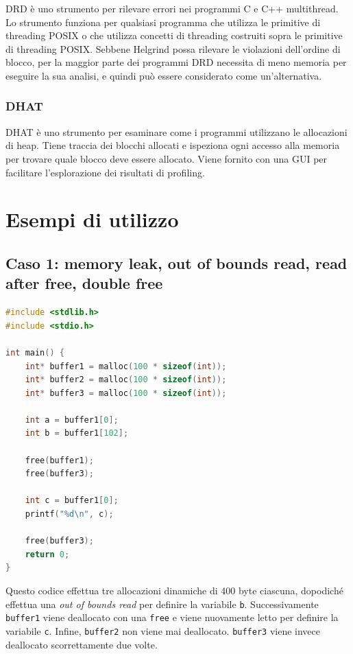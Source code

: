 \documentclass{article}
\begin{document}
DRD è uno strumento per rilevare errori nei programmi C e C++ multithread. Lo
strumento funziona per qualsiasi programma che utilizza le primitive di
threading POSIX o che utilizza concetti di threading costruiti sopra le
primitive di threading POSIX. Sebbene Helgrind possa rilevare le violazioni
dell'ordine di blocco, per la maggior parte dei programmi DRD necessita di meno
memoria per eseguire la sua analisi, e quindi può essere considerato come
un'alternativa.

\subsubsection{DHAT}

DHAT è uno strumento per esaminare come i programmi utilizzano le allocazioni di
heap. Tiene traccia dei blocchi allocati e ispeziona ogni accesso alla memoria
per trovare quale blocco deve essere allocato. Viene fornito con una GUI per
facilitare l'esplorazione dei risultati di profiling.


\newpage
\section{Esempi di utilizzo}

\subsection{Caso 1: memory leak, out of bounds read, read after free, double free}
\label{sec:caso1}

\begin{lstlisting}[language=c]
#include <stdlib.h>
#include <stdio.h>

int main() {
    int* buffer1 = malloc(100 * sizeof(int));
    int* buffer2 = malloc(100 * sizeof(int));
    int* buffer3 = malloc(100 * sizeof(int));

    int a = buffer1[0];
    int b = buffer1[102];

    free(buffer1);
    free(buffer3);

    int c = buffer1[0];
    printf("%d\n", c);

    free(buffer3);
    return 0;
}
\end{lstlisting}

Questo codice effettua tre allocazioni dinamiche di 400 byte ciascuna, dopodiché
effettua una \emph{out of bounds read} per definire la variabile \texttt{b}.
Successivamente \texttt{buffer1} viene deallocato con una \texttt{free} e viene
nuovamente letto per definire la variabile \texttt{c}. Infine, \texttt{buffer2}
non viene mai deallocato. \texttt{buffer3} viene invece deallocato
scorrettamente due volte. \\
\end{document}
